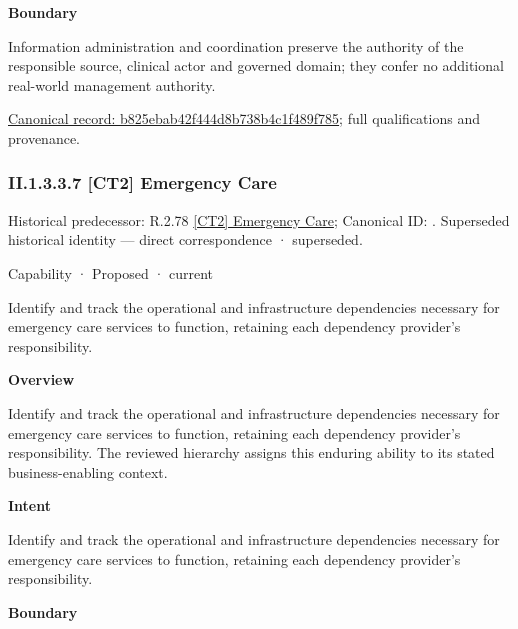 \textbf{Boundary}



Information administration and coordination preserve the authority of the responsible source, clinical actor and governed domain; they confer no additional real-world management authority.


{\footnotesize \href{../../../../continuum/strategy/capability/b825ebab42f444d8b738b4c1f489f785.md}{Canonical record: b825ebab42f444d8b738b4c1f489f785}; full qualifications and provenance.}\par
\subsubsection*{II.1.3.3.7 [CT2] Emergency Care}
\label{navigation:II.1.3.3.7}

{\small Historical predecessor: R.2.78 \hyperref[element:e5edbb54258c490aaba0816d980dc624]{[CT2] Emergency Care}; Canonical ID: \texttt{}. Superseded historical identity — direct correspondence · superseded.}\par
\label{element:aa088f0647ad4b78966fe28fa80af674}
{\small Capability · Proposed · current}\par

Identify and track the operational and infrastructure dependencies necessary for emergency care services to function, retaining each dependency provider's responsibility.



\textbf{Overview}



Identify and track the operational and infrastructure dependencies necessary for emergency care services to function, retaining each dependency provider's responsibility. The reviewed hierarchy assigns this enduring ability to its stated business-enabling context.



\textbf{Intent}



Identify and track the operational and infrastructure dependencies necessary for emergency care services to function, retaining each dependency provider's responsibility.



\textbf{Boundary}




